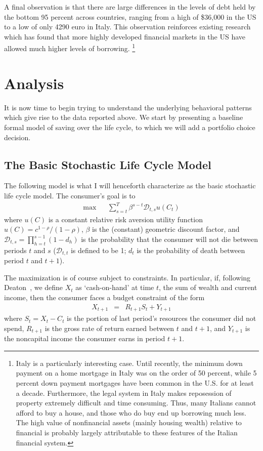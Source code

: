 \documentclass[12pt]{article}
\begin{document}
A final observation is that there are large differences in the levels of
debt held by the bottom 95 percent across countries, ranging from a high of
\$36,000 in the US to a low of only 4290 euro in Italy. This observation
reinforces existing research which has found that more highly developed
financial markets in the US have allowed much higher levels of borrowing.%
\footnote{%
Italy is a particularly interesting case. Until recently, the minimum down
payment on a home mortgage in Italy was on the order of 50 percent, while 5
percent down payment mortgages have been common in the U.S. for at least a
decade. Furthermore, the legal system in Italy makes reposession of property
extremely difficult and time consuming. Thus, many Italians cannot afford to
buy a house, and those who do buy end up borrowing much less. The high value
of nonfinancial assets (mainly housing wealth) relative to financial is
probably largely attributable to these features of the Italian financial
system.}

\section{Analysis}

It is now time to begin trying to understand the underlying behavioral
patterns which give rise to the data reported above. We start by presenting
a baseline formal model of saving over the life cycle, to which we will add
a portfolio choice decision.

\subsection{The Basic Stochastic Life Cycle Model}

The following model is what I will henceforth characterize as the basic
stochastic life cycle model. The consumer's goal is to 
\begin{eqnarray}
\max & & \sum_{s=t}^{T} \beta^{s-t} \mathcal{D}_{t,s} u(C_{t})
\label{eq:maxutil}
\end{eqnarray}
where $u(C)$ is a constant relative risk aversion utility function $%
u(C)=c^{1-\rho}/(1-\rho)$, $\beta$ is the (constant) geometric discount
factor, and $\mathcal{D}_{t,s} = \prod_{h=t}^{s-1}(1-d_{h})$ is the
probability that the consumer will not die between periods $t$ and $s$ ($%
\mathcal{D}_{t,t}$ is defined to be 1; $d_{t}$ is the probability of death
between period $t$ and $t+1$).

The maximization is of course subject to constraints. In particular, if,
following Deaton~\cite{deatonLiqConstrs}, we define $X_{t}$ as
`cash-on-hand' at time $t$, the sum of wealth and current income, then the
consumer faces a budget constraint of the form 
\begin{eqnarray*}
X_{t+1} & = & R_{t+1}S_{t} + Y_{t+1}
\end{eqnarray*}
where $S_{t} = X_{t}-C_{t}$ is the portion of last period's resources the
consumer did not spend, $R_{t+1}$ is the gross rate of return earned between 
$t$ and $t+1$, and $Y_{t+1}$ is the noncapital income the consumer earns in
period $t+1$.
\end{document}
